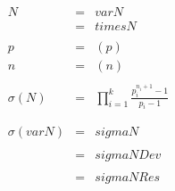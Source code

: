 \documentclass{minimal}
\begin{document}
    \begin{eqnarray}
                         N &=& {{varN}}               \nonumber \\
                           &=& {{timesN}}                       \\
                                                      \nonumber \\
                         p &=& \left( {{p}} \right)             \\
                         n &=& \left( {{n}} \right)             \\
                                                      \nonumber \\
                \sigma (N) &=&
                    {\prod_{i=1}^{k}
                    \frac{p_i^{n_i+1} - 1}{p_i - 1}}            \\
                                                      \nonumber \\
                                                      \nonumber \\
         \sigma ({{varN}}) &=& {{sigmaN}}             \nonumber \\
                                                      \nonumber \\
                           &=& {{sigmaNDev}}          \nonumber \\
                                                      \nonumber \\
                           &=& {{sigmaNRes}}
    \end{eqnarray}
\end{document}

